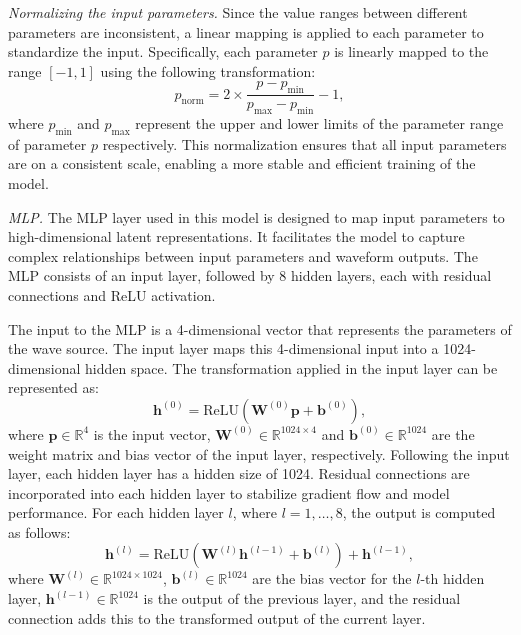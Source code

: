 \documentclass[
reprint,
superscriptaddress,
amsmath,amssymb,
aps,
prd,
floatfix,
]{revtex4-2}
\begin{document}
\textit{Normalizing the input parameters.\textemdash} Since the value ranges between different parameters are inconsistent, a linear mapping is applied to each parameter to standardize the input. Specifically, each parameter $p$ is linearly mapped to the range $[-1, 1]$ using the following transformation:
\begin{equation}
    p_{\text{norm}} = 2 \times \frac{p - p_{\text{min}}}{p_{\text{max}} - p_{\text{min}}} - 1,
\end{equation}
where $p_{\text{min}}$  and $p_{\text{max}}$ represent the upper and lower limits of the parameter range of parameter $p$ respectively. 
This normalization ensures that all input parameters are on a consistent scale, enabling a more stable and efficient training of the model.

\textit{MLP.\textemdash} The MLP layer used in this model is designed to map input parameters to high-dimensional latent representations. 
It facilitates the model to capture complex relationships between input parameters and waveform outputs. 
The MLP consists of an input layer, followed by 8 hidden layers, each with residual connections and ReLU activation.

The input to the MLP is a 4-dimensional vector that represents the parameters of the wave source. The input layer maps this 4-dimensional input into a 1024-dimensional hidden space. The transformation applied in the input layer can be represented as:
\begin{equation}
    \mathbf{h}^{(0)} = \text{ReLU}\left( \mathbf{W}^{(0)} \mathbf{p} + \mathbf{b}^{(0)} \right),
\end{equation}
where $\mathbf{p} \in \mathbb{R}^4$ is the input vector, $\mathbf{W}^{(0)} \in \mathbb{R}^{1024 \times 4}$  and  $\mathbf{b}^{(0)} \in \mathbb{R}^{1024}$ are the weight matrix and bias vector of the input layer, respectively. 
Following the input layer, each hidden layer has a hidden size of 1024. Residual connections are incorporated into each hidden layer to stabilize gradient flow and model performance. For each hidden layer $l$, where $l = 1, \dots, 8$, the output is computed as follows:
\begin{equation}
    \mathbf{h}^{(l)} = \text{ReLU}\left(  \mathbf{W}^{(l)} \mathbf{h}^{(l-1)} + \mathbf{b}^{(l)} \right)  + \mathbf{h}^{(l-1)},
\end{equation}
where $\mathbf{W}^{(l)} \in \mathbb{R}^{1024 \times 1024}$, $\mathbf{b}^{(l)} \in \mathbb{R}^{1024}$ are the bias vector for the $l$-th hidden layer, $\mathbf{h}^{(l-1)} \in \mathbb{R}^{1024}$ is the output of the previous layer, and the residual connection adds this to the transformed output of the current layer. 
\end{document}
